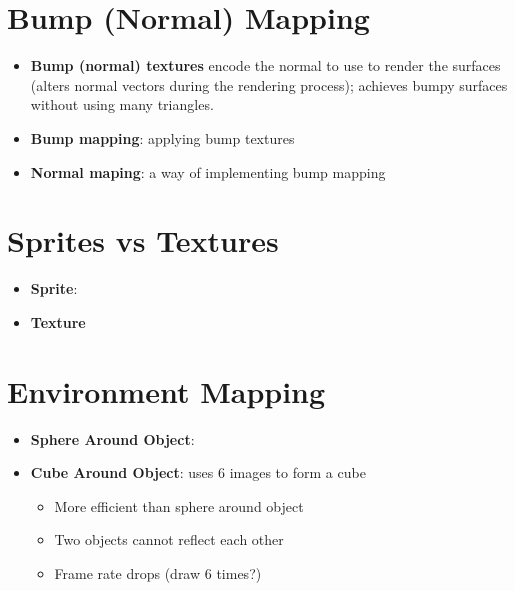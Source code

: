 \section{Bump (Normal) Mapping}

  \begin{itemize}
    \item \textbf{Bump (normal) textures} encode the normal to use to render the
    surfaces (alters normal vectors during the rendering process);
    achieves bumpy surfaces without using many triangles.
    \item \textbf{Bump mapping}: applying bump textures
    \item \textbf{Normal maping}: a way of implementing bump mapping
  \end{itemize}


\section{Sprites vs Textures}

  \begin{itemize}
    \item \textbf{Sprite}:
    \item \textbf{Texture}
  \end{itemize}

\section{Environment Mapping}

  \begin{itemize}
    \item \textbf{Sphere Around Object}:
    \item \textbf{Cube Around Object}: uses 6 images to form a cube
    \begin{itemize}
      \item More efficient than sphere around object
      \item Two objects cannot reflect each other
      \item Frame rate drops (draw 6 times?)
    \end{itemize}
  \end{itemize}
